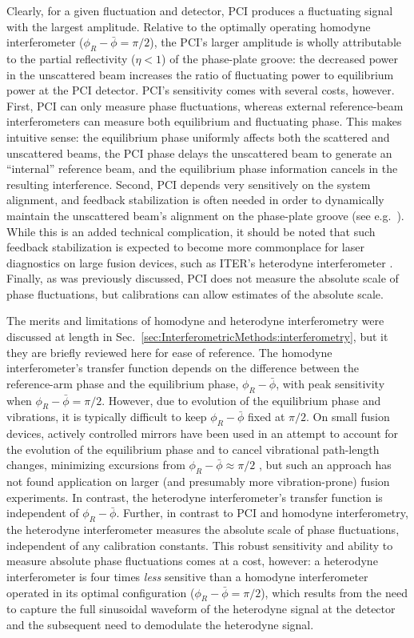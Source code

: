 Clearly, for a given fluctuation and detector,
PCI produces a fluctuating signal with the largest amplitude.
Relative to the optimally operating homodyne interferometer
($\phi_R - \bar{\phi} = \pi / 2$),
the PCI's larger amplitude is wholly attributable
to the partial reflectivity ($\eta < 1$) of the phase-plate groove:
the decreased power in the unscattered beam
increases the ratio of fluctuating power to equilibrium power
at the PCI detector.
PCI's sensitivity comes with several costs, however.
First, PCI can only measure phase fluctuations,
whereas external reference-beam interferometers
can measure both equilibrium and fluctuating phase.
This makes intuitive sense:
the equilibrium phase uniformly affects
both the scattered and unscattered beams,
the PCI phase delays the unscattered beam
to generate an ``internal'' reference beam, and
the equilibrium phase information cancels in the resulting interference.
Second, PCI depends very sensitively on the system alignment, and
feedback stabilization is often needed
in order to dynamically maintain
the unscattered beam's alignment on the phase-plate groove
(see e.g.~\cite[Ch.~3.5]{coda_phd}).
While this is an added technical complication,
it should be noted that such feedback stabilization
is expected to become more commonplace
for laser diagnostics on large fusion devices,
such as ITER's heterodyne interferometer
\cite{vanzeeland_TIP_rsi13}.
Finally, as was previously discussed,
PCI does not measure the absolute scale of phase fluctuations, but
calibrations can allow estimates of the absolute scale.

The merits and limitations of homodyne and heterodyne interferometry
were discussed at length in
Sec.~{\ref{sec:InterferometricMethods:interferometry}}, but
it they are briefly reviewed here for ease of reference.
The homodyne interferometer's transfer function depends on
the difference between the reference-arm phase and
the equilibrium phase, $\phi_R - \bar{\phi}$,
with peak sensitivity when
$\phi_R - \bar{\phi} = \pi / 2$.
However, due to evolution of the equilibrium phase and vibrations,
it is typically difficult to keep $\phi_R - \bar{\phi}$ fixed at $\pi / 2$.
On small fusion devices,
actively controlled mirrors have been used in an attempt
to account for the evolution of the equilibrium phase and
to cancel vibrational path-length changes,
minimizing excursions from $\phi_R - \bar{\phi} \approx \pi / 2$
\cite{nazikian_rsi87}, but
such an approach has not found application on larger
(and presumably more vibration-prone) fusion experiments.
In contrast, the heterodyne interferometer's transfer function
is independent of $\phi_R - \bar{\phi}$.
Further, in contrast to PCI and homodyne interferometry,
the heterodyne interferometer measures
the absolute scale of phase fluctuations,
independent of any calibration constants.
This robust sensitivity and ability to measure absolute phase fluctuations
comes at a cost, however:
a heterodyne interferometer is four times \emph{less} sensitive
than a homodyne interferometer operated in its optimal configuration
($\phi_R - \bar{\phi} = \pi / 2$), which results from
the need to capture the full sinusoidal waveform
of the heterodyne signal at the detector and
the subsequent need to demodulate the heterodyne signal.


